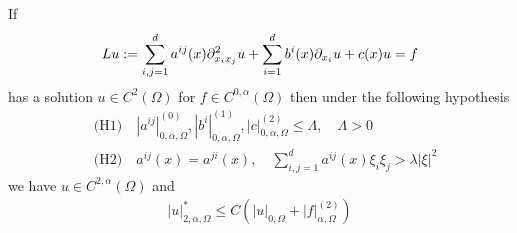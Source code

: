 \documentclass[12pt,a4paper]{article}
\begin{document}
 If
\begin{align*}
Lu := \sum_{i,j=1}^d a^{ij}(x) \partial^2_{x_i x_j} u + \sum_{i=1}^d b^i(x) \partial_{x_i} u + c(x)u =f
\end{align*}
has a solution $u\in C^2(\Omega)$ for $f\in C^{0, \alpha}(\Omega)$ then under the following hypothesis
\begin{align*}
&\text{(H1)} \quad |a^{ij}|_{0, \alpha, \Omega}^{(0)}, |b^i|^{(1)}_{0, \alpha, \Omega}, |c|^{(2)}_{0, \alpha, \Omega}\leq \Lambda, \quad \Lambda>0 \\
&\text{(H2)} \quad a^{ij}(x) = a^{ji}(x), \quad \sum_{i,j=1}^d a^{ij}(x) \xi_i \xi_j > \lambda |\xi|^2
\end{align*}
we have $u\in C^{2,\alpha}(\Omega)$ and
\begin{align*}
|u|^*_{2, \alpha, \Omega} \leq C(|u|_{0, \Omega} + |f|^{(2)}_{\alpha, \Omega})
\end{align*}
\end{document}
